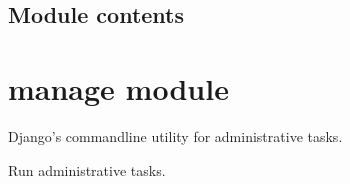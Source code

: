 \documentclass[letterpaper,11pt,polish]{sphinxmanual}
\begin{document}
\subsection{Module contents}
\label{\detokenize{mainApp:module-mainApp}}\label{\detokenize{mainApp:module-contents}}
\sphinxstepscope


\section{manage module}
\label{\detokenize{manage:module-manage}}\label{\detokenize{manage:manage-module}}\label{\detokenize{manage::doc}}
\sphinxAtStartPar
Django’s command\sphinxhyphen{}line utility for administrative tasks.

\begin{fulllineitems}
\label{\detokenize{manage:manage.main}}
\pysigstartsignatures
{}
\pysigstopsignatures
\sphinxAtStartPar
Run administrative tasks.

\end{fulllineitems}
\end{document}
